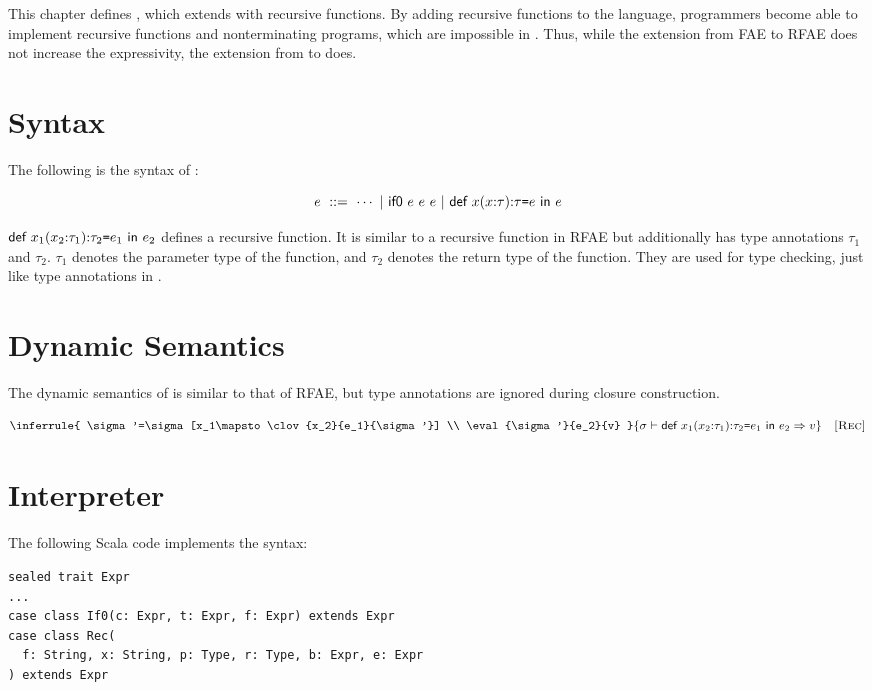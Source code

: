 This chapter defines \Lang, which extends \plang with recursive functions. By
adding recursive functions to the language, programmers become able to implement
recursive functions and nonterminating programs, which are impossible in \plang.
Thus, while the extension from \textsf{FAE} to \textsf{RFAE} does not increase
the expressivity, the extension from \plang to \Lang does.

\section{Syntax}

The following is the syntax of \Lang:

\[
e\ ::=\ \cdots
\ | \ \textsf{if0}\ e\ e\ e
\ | \ \textsf{def}\ x(x{:}\tau){:}\tau\texttt{=} e\ \textsf{in}\ e
\]

$\textsf{def}\ x_1(x_2{:}\tau_1){:}\tau_2\texttt{=} e_1\ \textsf{in}\ e_2$ defines a recursive
function. It is similar to a recursive function in \textsf{RFAE} but
additionally has
type annotations $\tau_1$ and $\tau_2$. $\tau_1$ denotes the parameter type of the
function, and $\tau_2$ denotes the return type of the function. They are
used for type checking, just like type annotations in \plang.

\section{Dynamic Semantics}

The dynamic semantics of \Lang is similar to that of \textsf{RFAE}, but type
annotations are ignored during closure construction.


\vspace{-1em}

\[
  \inferrule
  {
    \sigma'=\sigma[x_1\mapsto\clov{x_2}{e_1}{\sigma'}] \\
    \eval{\sigma'}{e_2}{v}
  }
  { \evald{\erect{x_1}{x_2}{\tau_1}{\tau_2}{e_1}{e_2}}{v} }
  \quad\textsc{[Rec]}
\]

\section{Interpreter}

The following Scala code implements the syntax:

\begin{verbatim}
sealed trait Expr
...
case class If0(c: Expr, t: Expr, f: Expr) extends Expr
case class Rec(
  f: String, x: String, p: Type, r: Type, b: Expr, e: Expr
) extends Expr
\end{verbatim}

